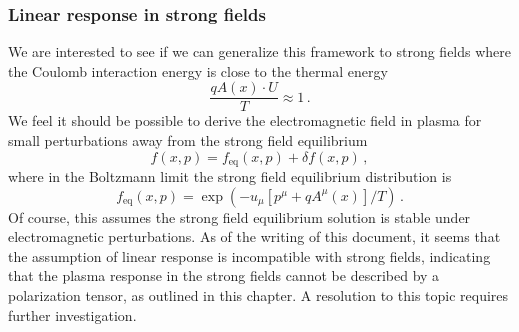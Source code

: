 \subsubsection{Linear response in strong fields}
We are interested to see if we can generalize this framework to strong fields where the Coulomb interaction energy is close to the thermal energy
\begin{equation}
    \frac{ qA(x)\cdot U}{T}\approx 1\,.
\end{equation}
We feel it should be possible to derive the electromagnetic field in plasma for small perturbations away from the strong field equilibrium 
\begin{equation}
    f(x,p) = f_\text{eq}(x,p) + \delta f (x,p)\,,
\end{equation}
where in the Boltzmann limit the strong field equilibrium distribution is \cite{Hakim:2011bk,Hakim:1967prd}
\begin{equation}
     f_\text{eq}(x,p) = \exp \left(-u_{\mu}[p^{\mu}+q A^{\mu}(x)]/T\right)\,.
\end{equation}
Of course, this assumes the strong field equilibrium solution is stable under electromagnetic perturbations. As of the writing of this document, it seems that the assumption of linear response is incompatible with strong fields, indicating that the plasma response in the strong fields cannot be described by a polarization tensor, as outlined in this chapter. A resolution to this topic requires further investigation.


